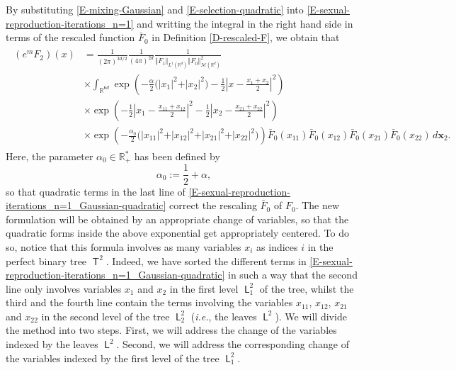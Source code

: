\documentclass[reqno]{amsart}
\DeclareMathOperator{\Tree}{\mathsf{T}}
\DeclareMathOperator{\Leaves}{\mathsf{L}}
\DeclareMathOperator{\Level}{\mathsf{L}}
\numberwithin{equation}{section}
\begin{document}
{By substituting \eqref{E-mixing-Gaussian} and \eqref{E-selection-quadratic} into \eqref{E-sexual-reproduction-iterations_n=1} and writting the integral in the right hand side in terms of the rescaled function $\bar{F}_0$ in Definition \ref{D-rescaled-F}, we obtain that
\begin{align}\label{E-sexual-reproduction-iterations_n=1_Gaussian-quadratic}
\begin{aligned}
(e^m F_2)(x)&=\frac{1}{(2\pi)^{3d/2}}\frac{1}{(4\pi)^{2d}}\frac{1}{\Vert F_1\Vert_{L^1(\mathbb{R}^d)}\Vert F_0\Vert_{\mathcal{M}(\mathbb{R}^d)}^2}\\
&\times \int_{\mathbb{R}^{6d}} \exp\left(-\frac{\alpha}{2}\big(\vert x_1\vert^2+\vert x_2\vert^2\big)-\frac{1}{2}\left\vert x-\frac{x_1+x_2}{2}\right\vert^2\right)\\
&\times \exp\left(-\frac{1}{2}\left\vert x_1-\frac{x_{11}+x_{12}}{2}\right\vert^2-\frac{1}{2}\left\vert x_2-\frac{x_{21}+x_{22}}{2}\right\vert^2\right)\\
&\times \exp\left(-\frac{\alpha_0}{2}\big(\vert x_{11}\vert^2+\vert x_{12}\vert^2+\vert x_{21}\vert^2+\vert x_{22}\vert^2\big)\right)\bar{F}_0(x_{11})\bar{F}_0(x_{12})\bar{F}_0(x_{21})\bar{F}_0(x_{22})\,d\mathbf{x}_2.
\end{aligned}
\end{align}
Here, the parameter $\alpha_0\in \mathbb{R}_+^*$ has been defined by
$$\alpha_0:=\frac{1}{2}+\alpha,$$
so that quadratic terms in the last line of \eqref{E-sexual-reproduction-iterations_n=1_Gaussian-quadratic} correct the rescaling $\bar{F}_0$ of $F_0$. The new formulation will be obtained by an appropriate change of variables, so that the quadratic forms inside the above exponential get appropriately centered. To do so, notice that this formula involves as many variables $x_i$ as indices $i$ in the perfect binary tree $\Tree^2$. Indeed, we have sorted the different terms in \eqref{E-sexual-reproduction-iterations_n=1_Gaussian-quadratic} in such a way that the second line only involves variables $x_1$ and $x_2$ in the first level $\Level_1^2$ of the tree, whilst the third and the fourth line contain the terms involving the variables $x_{11}$, $x_{12}$, $x_{21}$ and $x_{22}$ in the second level of the tree $\Level_2^2$ ({\em i.e.}, the leaves $\Leaves^2$). We will divide the method into two steps. First, we will address the change of the variables indexed by the leaves $\Leaves^2$. Second, we will address the corresponding change of the variables indexed by the first level of the tree $\Level_1^2$.

}
\end{document}
